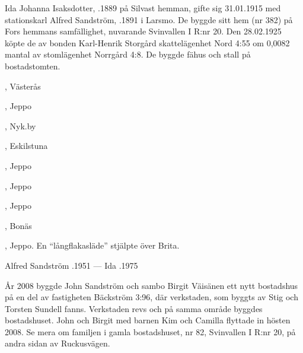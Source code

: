 
Ida Johanna Isaksdotter, .1889 på Silvast hemman, gifte sig 31.01.1915 med stationskarl Alfred Sandström, .1891 i Larsmo. De byggde sitt hem (nr 382) på Fors hemmans samfällighet, nuvarande Svinvallen I R:nr 20. Den 28.02.1925 köpte de av bonden Karl-Henrik Storgård skattelägenhet Nord 4:55 om 0,0082 mantal av stomlägenhet Norrgård 4:8. De byggde fähus och stall på bostadstomten.
\begin{jhchildren}
  \item {}, Västerås
  \item {}, Jeppo
  \item {}, Nyk.by
  \item {}, Eskilstuna
  \item {}, Jeppo
  \item {}, Jeppo
  \item {}, Jeppo
  \item {}
  \item {}, Bonäs
  \item {}, Jeppo. En ``långflakasläde'' stjälpte över Brita.
\end{jhchildren}


Alfred Sandström .1951  ---  Ida .1975






År 2008 byggde John Sandström och sambo Birgit Väisänen ett nytt bostadshus på en del av fastigheten Bäckström 3:96, där verkstaden, som byggts av Stig och Torsten Sundell fanns. Verkstaden revs och på 	samma område byggdes bostadshuset. John och Birgit med barnen Kim och Camilla flyttade in hösten 2008. Se mera om familjen i gamla bostadshuset, nr 82, Svinvallen I R:nr 20, på andra sidan av Ruckusvägen.


